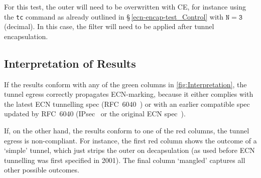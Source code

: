 For this test, the outer will need to be overwritten with CE, for instance using the \texttt{tc} command as already outlined in \S\,\ref{ecn-encap-test_Control} with \(\mathtt{N}=\mathtt{3}\) (decimal). In this case, the filter will need to be applied after tunnel encapsulation.

\subsection{Interpretation of Results}\label{ecn-encap-test_Interpretation}

If the results conform with any of the green columns in \autoref{fig:Interpretation}, the tunnel egress correctly propagates ECN-marking, because it either complies with the latest ECN tunnelling spec (RFC~6040~\cite{Briscoe07b:ECN-tunnel}) or with an earlier compatible spec updated by RFC~6040 (IPsec~\cite{IETF_RFC4301:IPSEC_architecture} or the original ECN spec~\cite{rfc3168}).

If, on the other hand, the results conform to one of the red columns, the tunnel egress is non-compliant. For instance, the first red column shows the outcome of a `simple' tunnel, which just strips the outer on decapsulation (as used before ECN tunnelling was first specified in 2001). The final column `mangled' captures all other possible outcomes.
